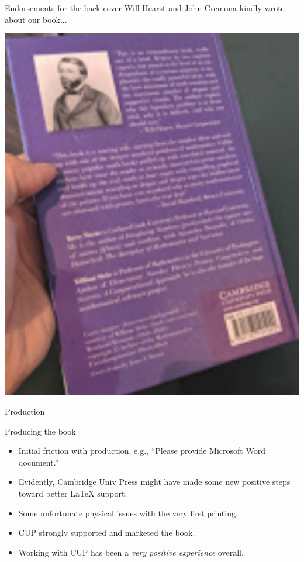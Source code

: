 \documentclass{beamer}
\begin{document}
\begin{frame}{Endorsements for the back cover}
  Will Hearst and John Cremona kindly wrote about our book...

  \begin{center}
    \includegraphics[height=.7\textheight]{pics/cover-back}
  \end{center}
\end{frame}

\begin{frame}{Production}
  \begin{block}{Producing the book}
    \begin{itemize}
      \item Initial friction with production, e.g., ``Please provide Microsoft Word document.''
      \item Evidently, Cambridge Univ Press might have made some new positive steps toward better \LaTeX{} support.
      \item Some unfortunate physical issues with the very first printing.
      \item CUP strongly supported and marketed the book.
      \item Working with CUP has been a {\em very positive experience} overall.
    \end{itemize}
  \end{block}
\end{frame}
\end{document}
